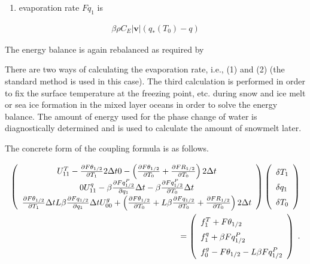 \begin{enumerate}
\def\labelenumi{\arabic{enumi}.}
\setcounter{enumi}{1}
\tightlist
\item
  evaporation rate \(Fq_1\) is
\end{enumerate}

\begin{eqnarray}
        \beta \rho C_E |{\mathbf{v}}| ( q_*(T_0) - q )
\end{eqnarray}

The energy balance is again rebalanced as required by

There are two ways of calculating the evaporation rate, i.e., (1) and (2) (the standard method is used in this case). The third calculation is performed in order to fix the surface temperature at the
freezing point, etc. during snow and ice melt or sea ice formation in the mixed layer oceans in order to solve the energy balance. The amount of energy used for the phase change of water is
diagnostically determined and is used to calculate the amount of snowmelt later.

The concrete form of the coupling formula is as follows.

\begin{eqnarray}
  \renewcommand{\arraystretch}{1.5}
  \left( \begin{array}{ccc}
      U_{11}^T - \frac{\partial{F\theta_{1/2}}}{\partial {T_1}} 2 \Delta t
      0
      - \left( \frac{\partial{F\theta_{1/2}}}{\partial {T_0}}
                         + \frac{\partial{FR_{1/2}}}{\partial {T_0}}\right) 2 \Delta t \\
      0
      U_{11}^q - \beta \frac{\partial{Fq^P_{1/2}}}{\partial {q_1}} \Delta t
      - \beta \frac{\partial{Fq^P_{1/2}}}{\partial {T_0}} \Delta t \\
        \frac{\partial{F\theta_{1/2}}}{\partial {T_1}} \Delta t
      L \beta \frac{\partial{Fq_{1/2}}}{\partial {q_1}} \Delta t
      U_{00}^g + \left(\frac{\partial{F\theta_{1/2}}}{\partial {T_0}}
                + L \beta \frac{\partial{Fq_{1/2}}}{\partial {T_0}}
                + \frac{\partial{FR_{1/2}}}{\partial {T_0}} \right) 2 \Delta t \\
  \end{array} \right)
  \left( \begin{array}{l}
      \delta T_1 \\ \delta q_1 \\ \delta T_0 \\
  \end{array} \right)   \\
=  \left( \begin{array}{l}
      f_1^T + F\theta_{1/2} \\
      f_1^q + \beta Fq^P_{1/2} \\
      f_0^g - F\theta_{1/2} - L \beta Fq^P_{1/2} \\
  \end{array} \right) \; .
\end{eqnarray}

